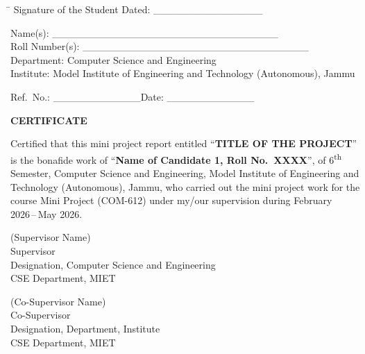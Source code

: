 \documentclass[12pt,a4paper]{report}
\newcommand{\projecttitle}{TITLE OF THE PROJECT}
\newcommand{\studentA}{Name of Candidate 1}
\newcommand{\rollA}{XXXX}
\newcommand{\supervisor}{Supervisor Name}
\newcommand{\supervisordesig}{Designation, Computer Science and Engineering}
\newcommand{\cosupervisor}{Co-Supervisor Name}     %
\newcommand{\cosupervisordesig}{Designation, Department, Institute}
\newcommand{\projectperiod}{February 2026\,--\,May 2026}
\newcommand{\department}{Computer Science and Engineering}
\newcommand{\institute}{Model Institute of Engineering and Technology (Autonomous)}
\numberwithin{equation}{chapter}
\begin{document}
\noindent
\begin{tabbing}
\hspace{8cm} \= \kill
Signature of the Student \> Dated: \_\_\_\_\_\_\_\_\_\_\_\_\_\_\_
\end{tabbing}

\vspace{0.3cm}
\noindent Name(s): \_\_\_\_\_\_\_\_\_\_\_\_\_\_\_\_\_\_\_\_\_\_\_\_\_\_\_\_\_\_\_\\[0.2cm]
Roll Number(s): \_\_\_\_\_\_\_\_\_\_\_\_\_\_\_\_\_\_\_\_\_\_\_\_\_\_\_\_\_\_\_\\[0.2cm]
Department: \department\\[0.2cm]
Institute: \institute, Jammu

\vspace{1cm}
\hfill Ref.\ No.: \_\_\_\_\_\_\_\_\_\_\_\_\hspace{1cm}Date: \_\_\_\_\_\_\_\_\_\_\_\_

\newpage
\begin{center}
\vspace*{2cm}
{\fontsize{16}{19}\selectfont \textbf{CERTIFICATE}}
\end{center}

\vspace{1cm}

\noindent
Certified that this mini project report entitled ``\textbf{\projecttitle}'' is the
bonafide work of ``\textbf{\studentA, Roll No.\ \rollA}'', of 6\textsuperscript{th}
Semester, \department, \institute, Jammu, who carried out the mini project work for the
course Mini Project (COM-612) under my/our supervision during \projectperiod.

\vspace{2cm}

\noindent
\begin{minipage}[t]{0.45\textwidth}
(\supervisor)\\
Supervisor\\
\supervisordesig\\
CSE Department, MIET
\end{minipage}
\hfill
\begin{minipage}[t]{0.45\textwidth}
(\cosupervisor)\\
Co-Supervisor\\
\cosupervisordesig\\
CSE Department, MIET
\end{minipage}
\end{document}
